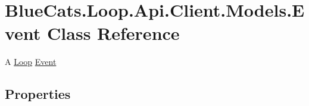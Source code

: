 \hypertarget{class_blue_cats_1_1_loop_1_1_api_1_1_client_1_1_models_1_1_event}{}\section{Blue\+Cats.\+Loop.\+Api.\+Client.\+Models.\+Event Class Reference}
\label{class_blue_cats_1_1_loop_1_1_api_1_1_client_1_1_models_1_1_event}


A \mbox{\hyperlink{namespace_blue_cats_1_1_loop}{Loop}} \mbox{\hyperlink{class_blue_cats_1_1_loop_1_1_api_1_1_client_1_1_models_1_1_event}{Event}}  


\subsection*{Properties}
